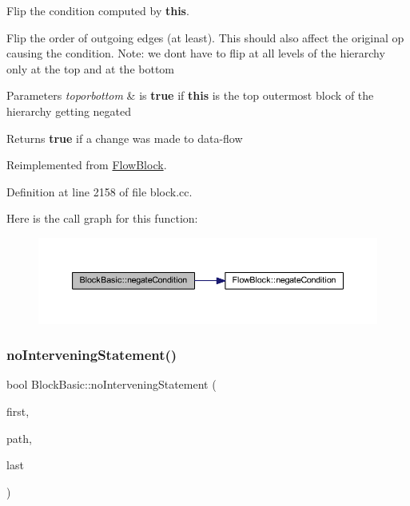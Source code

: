 Flip the condition computed by {\bfseries{this}}. 

Flip the order of outgoing edges (at least). This should also affect the original op causing the condition. Note\+: we don\textquotesingle{}t have to flip at all levels of the hierarchy only at the top and at the bottom 
\begin{DoxyParams}{Parameters}
{\em toporbottom} & is {\bfseries{true}} if {\bfseries{this}} is the top outermost block of the hierarchy getting negated \\
\hline
\end{DoxyParams}
\begin{DoxyReturn}{Returns}
{\bfseries{true}} if a change was made to data-\/flow 
\end{DoxyReturn}


Reimplemented from \mbox{\hyperlink{class_flow_block_ae0f8a479ae1548280ff0b4f45bc08dc3}{Flow\+Block}}.



Definition at line 2158 of file block.\+cc.

Here is the call graph for this function\+:
\nopagebreak
\begin{figure}[H]
\begin{center}
\leavevmode
\includegraphics[width=350pt]{class_block_basic_aa15eaf687397a3b73da57abbb061a04c_cgraph}
\end{center}
\end{figure}
\mbox{\label{class_block_basic_aa6121743b8e601f2eca7f396b413b35f}} 
\subsubsection{\texorpdfstring{noInterveningStatement()}{noInterveningStatement()}}
{\footnotesize\ttfamily bool Block\+Basic\+::no\+Intervening\+Statement (\begin{DoxyParamCaption}\item[{\mbox{\hyperlink{class_pcode_op}{Pcode\+Op}} $\ast$}]{first,  }\item[{int4}]{path,  }\item[{\mbox{\hyperlink{class_pcode_op}{Pcode\+Op}} $\ast$}]{last }\end{DoxyParamCaption})\hspace{0.3cm}{\ttfamily [static]}}



